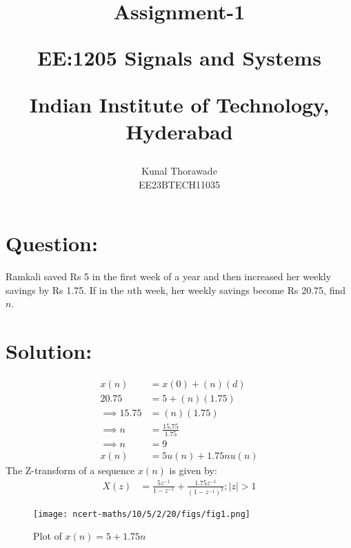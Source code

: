 \documentclass[journal,12pt,twocolumn]{IEEEtran}
\theoremstyle{remark}
\begin{document}
%




\vspace{3cm}

\title{
	Assignment-1 

	\large{EE:1205 Signals and Systems}

	Indian Institute of Technology, Hyderabad
}
\author{Kunal Thorawade

EE23BTECH11035
}	

\maketitle


\newpage


\bigskip
 
 \renewcommand{\thefigure}{\theenumi}
 \renewcommand{\thetable}{\theenumi}

 \section{\Large Question:}  Ramkali saved Rs 5 in the first week of a year and then increased her weekly savings by Rs 1.75. If in the $n$th week, her weekly savings become Rs 20.75, find $n$.

 \section{\Large Solution:} 
 \fi
 

 \begin{align} 
	 x(n) &= x(0) + (n)(d)
	 \\ 20.75 &= 5 + (n)(1.75)  
	 \\ \implies 15.75 &= (n)(1.75)
	 \\ \implies n &= \frac{15.75}{1.75}
	 \\ \implies n &= 9
	 \\x(n) &= 5u(n) + 1.75nu(n)
 \end{align}
 The Z-transform of a sequence $x(n)$ is given by:
 \begin{align}
	  X(z) &= \frac{5z^{-1}}{1-z^{-1}}+\frac{1.75z^{-1}}{(1-z^{-1})^{2}} ; |z| > 1
 \end{align}

 \begin{figure}
	     \centering
	         \texttt{[image: ncert-maths/10/5/2/20/figs/fig1.png]}
		     \caption{Plot of $x(n) = 5 + 1.75n$}
		         \label{fig:enter-label}
 \end{figure}
\end{document}
